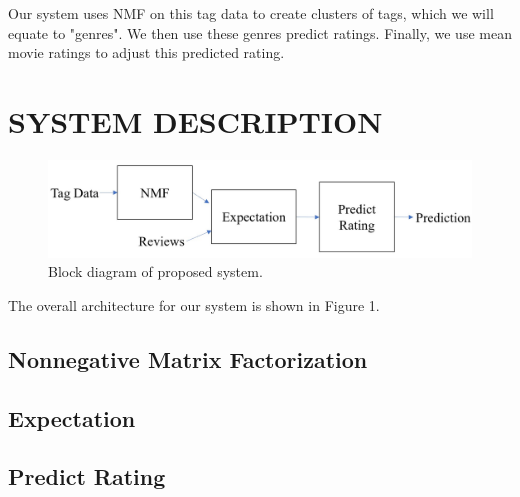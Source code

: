 \documentclass[letterpaper, 10 pt, conference]{ieeeconf}  %
\begin{document}
Our system uses NMF on this tag data to create clusters of tags, which we will equate to "genres". We then use these genres predict ratings. Finally, we use mean movie ratings to adjust this predicted rating.


\section{SYSTEM DESCRIPTION}

\begin{figure}[h]
   \includegraphics[scale=0.5]{./figs/blockdiagram.jpg}
   \caption{Block diagram of proposed system.}
\end{figure}

The overall architecture for our system is shown in Figure 1.

\subsection{Nonnegative Matrix Factorization}
\subsection{Expectation}
\subsection{Predict Rating}

\newpage
\end{document}
